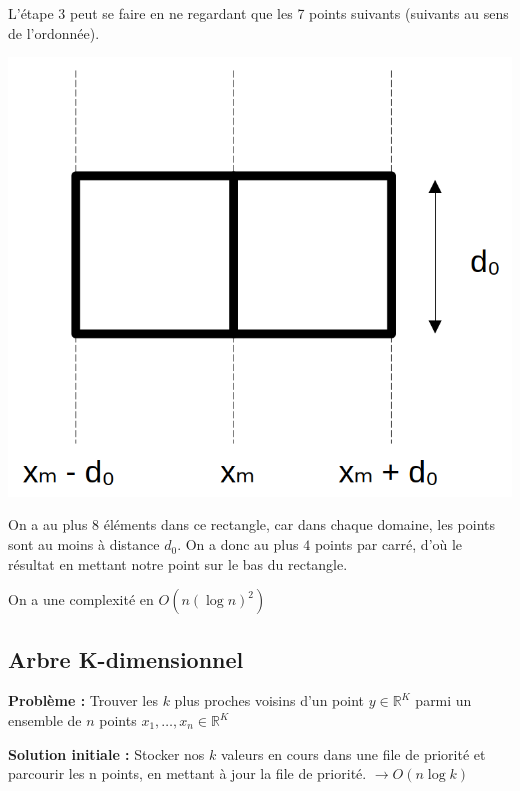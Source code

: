 L'étape 3 peut se faire en ne regardant que les 7 points suivants (suivants au sens de l'ordonnée).\\
\begin{minipage}{0.35\linewidth}
	\includegraphics[width=\linewidth]{lecon/13-D&R/7_points.png}
\end{minipage}
\qquad
\begin{minipage}{0.5\linewidth}
	On a au plus 8 éléments dans ce rectangle, car dans chaque domaine, les points sont au moins à distance $d_0$. On a donc au plus $4$ points par carré, d'où le résultat en mettant notre point sur le bas du rectangle.
\end{minipage}

\begin{proposition}
	On a une complexité en $O\left(n (\log n)^2\right)$
\end{proposition}




\subsection{Arbre K-dimensionnel}

\textbf{Problème :} Trouver les $k$ plus proches voisins d'un point $y \in \mathbb R^K$ parmi un ensemble de $n$ points $x_1, \dots, x_n \in \mathbb R^K$

\textbf{Solution initiale :} Stocker nos $k$ valeurs en cours dans une file de priorité et parcourir les n points, en mettant à jour la file de priorité. $\to O(n \log k)$

